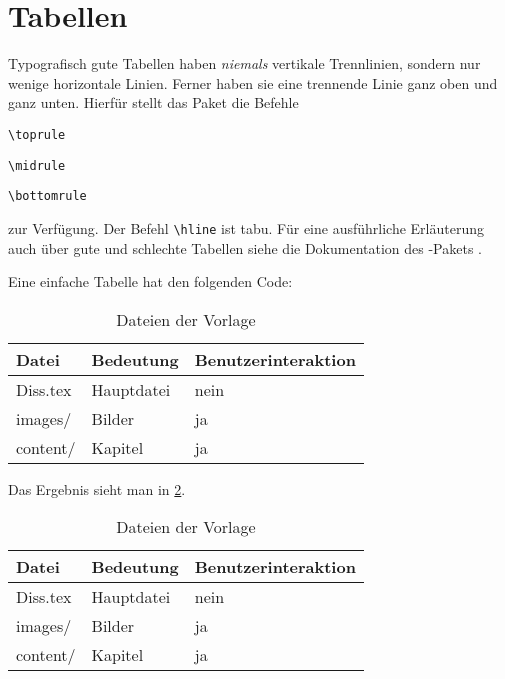 \section{Tabellen}
\label{sec:Tabellen}

Typografisch gute Tabellen haben \emph{niemals} vertikale Trennlinien,
sondern nur wenige horizontale Linien.
Ferner haben sie eine trennende Linie ganz oben und ganz unten.
Hierfür stellt das Paket  die Befehle
\begin{itemize*}
  \item \lstinline|\toprule|
	\item \lstinline|\midrule|
	\item \lstinline|\bottomrule|
\end{itemize*}
zur Verfügung.
Der Befehl \lstinline|\hline| ist tabu.
Für eine ausführliche Erläuterung auch über gute und schlechte Tabellen
siehe die Dokumentation des -Pakets \cite{Fear2005}.

Eine einfache Tabelle hat den folgenden Code:
\begin{latex}[caption={Einfache Tabelle in \LaTeX},label={lst:tabellenbeispiel}]
\begin{table}%
	\centering%
	\begin{tabularx}{\columnwidth}{l l X}%
		\toprule%
		Datei       &  Bedeutung    &  Benutzerinteraktion \\%
		\midrule%
		Diss.tex  &  Hauptdatei   &  nein     \\%
		images/   &  Bilder       &  ja       \\%
		content/  &  Kapitel      &  ja       \\%
		\bottomrule%
	\end{tabularx}%
	\caption{Dateien der Vorlage}%
	\label{tab:tabellenbeispiel}%
\end{table}
\end{latex}

Das Ergebnis sieht man in \cref{tab:tabellenbeispiel}.

\begin{table}%
	\centering%
	\begin{tabular}{l l l}%
		\toprule%
		Datei       &  Bedeutung    &  Benutzerinteraktion \\%
		\midrule%
		Diss.tex  &  Hauptdatei   &  nein     \\%
		images/   &  Bilder       &  ja       \\%
		content/  &  Kapitel      &  ja       \\%
		\bottomrule%
	\end{tabular}%
	\caption{Dateien der Vorlage}%
	\label{tab:tabellenbeispiel}%
\end{table}

